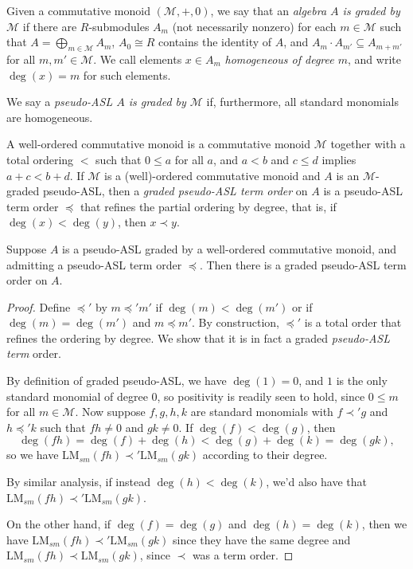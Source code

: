 \documentclass[11pt,reqno]{amsart}
\newcommand{\lmsm}{\text{LM}_{sm}}
\theoremstyle{definition}
\numberwithin{equation}{section}
\begin{document}
\begin{definition} \label{defn:graded-asl}
Given a commutative monoid $(\mathcal{M},+,0)$, we say that an \emph{algebra $A$ is graded by $\mathcal{M}$} if there are $R$-submodules $A_m$ (not necessarily nonzero) for each $m \in \mathcal{M}$ such that $A = \bigoplus_{m \in \mathcal{M}} A_m$, $A_0 \cong R$ contains the identity of $A$, and $A_m \cdot A_{m'} \subseteq A_{m+m'}$ for all $m,m' \in \mathcal{M}$. We call elements $x \in A_m$ \emph{homogeneous of degree $m$}, and write $\deg(x) = m$ for such elements. 

We say a \emph{pseudo-ASL $A$ is graded by $\mathcal{M}$} if, furthermore, all standard monomials are homogeneous. 

A well-ordered commutative monoid is a commutative monoid $\mathcal{M}$ together with a total ordering $<$ such that $0 \leq a$ for all $a$, and $a < b$ and $c \leq d$ implies $a+c < b+d$. If $\mathcal{M}$ is a (well)-ordered commutative monoid and $A$ is an $\mathcal{M}$-graded pseudo-ASL, then a \emph{graded pseudo-ASL term order} on $A$ is a pseudo-ASL term order $\preceq$ that refines the partial ordering by degree, that is, if $\deg(x) < \deg(y)$, then $x \prec y$. 
\end{definition}

\begin{observation} \label{obs:graded_order}
Suppose $A$ is a pseudo-ASL graded by a well-ordered commutative monoid, and admitting a pseudo-ASL term order $\preceq$. Then there is a graded pseudo-ASL term order on $A$.
\end{observation}

\begin{proof}
Define $\preceq'$ by $m \preceq' m'$ if $\deg(m) < \deg(m')$ or if $\deg(m) = \deg(m')$ and $m \preceq m'$. By construction, $\preceq'$ is a total order that refines the ordering by degree. We show that it is in fact a graded \emph{pseudo-ASL term} order.

By definition of graded pseudo-ASL, we have $\deg(1) = 0$, and $1$ is the only standard monomial of degree 0, so positivity is readily seen to hold, since $0 \leq m$ for all $m \in \mathcal{M}$. Now suppose $f,g,h,k$ are standard monomials with $f \prec' g$ and $h \preceq' k$ such that $fh \neq 0$ and $gk \neq 0$. If $\deg(f) < \deg(g)$, then \[\deg(fh) = \deg(f) + \deg(h) < \deg(g) + \deg(k) = \deg(gk),\] so we have $\lmsm(fh) \prec' \lmsm(gk)$ according to their degree. 

By similar analysis, if instead $\deg(h) < \deg(k)$, we'd also have that $\lmsm(fh) \prec' \lmsm(gk)$. 

On the other hand, if $\deg(f) = \deg(g)$ and $\deg(h) = \deg(k)$, then we have $\lmsm(fh) \prec' \lmsm(gk)$ since they have the same degree and $\lmsm(fh) \prec \lmsm(gk)$, since $\prec$ was a term order.
\end{proof}
\end{document}
